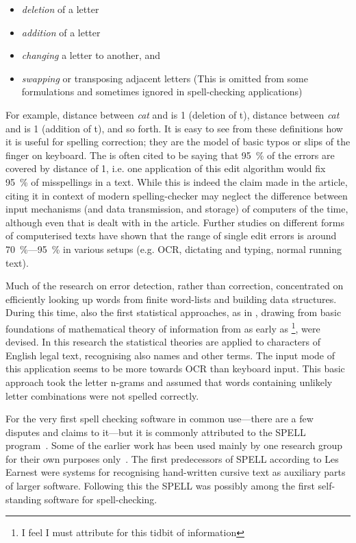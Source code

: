 \documentclass[officiallayout]{unihelcompling}
\newcommand\misspelt{\bgroup\markoverwith
{\textcolor{red}{\lower3.5pt\hbox{\sixly \char58}}}\ULon}
\begin{document}
\begin{itemize}
    \item \emph{deletion} of a letter
    \item \emph{addition} of a letter
    \item \emph{changing} a letter to another, and
    \item \emph{swapping} or transposing adjacent letters
        (This is omitted from some formulations and sometimes ignored in
        spell-checking applications)
\end{itemize}

For example, distance between \emph{cat} and \misspelt{ca} is 1 (deletion of
t), distance between \emph{cat} and \misspelt{catt} is 1 (addition of t), and
so forth.  It is easy to see from these definitions how it is useful for
spelling correction; they are the model of basic typos or slips of the finger
on keyboard. The \citep{damerau1964technique} is often cited to be saying that
95~\% of the errors are covered by distance of 1, i.e. one application of this
edit algorithm would fix 95~\% of misspellings in a text. While this is indeed
the claim made in the article, citing it in context of modern spelling-checker
may neglect the difference between input mechanisms (and data transmission, and
storage) of computers of the time, although even that is dealt with in the
article. Further studies on different forms of computerised texts have shown
that the range of single edit errors is around 70~\%---95~\% in various setups
(e.g. OCR, dictating and typing, normal running text).

Much of the research on error detection, rather than correction, concentrated
on efficiently looking up words from finite word-lists and building data
structures. During this time, also the first statistical approaches, as in
\citet{raviv1967decision}, drawing from basic foundations of mathematical
theory of information from as early as
\citet{shannon1948mathematical}\footnote{I feel I must attribute
\citet{liberman2012noisily} for this tidbit of information}, were devised. In
this research the statistical theories are applied to characters of English
legal text, recognising also names and other terms. The input mode of this
application seems to be more towards OCR than keyboard input. This basic
approach took the letter n-grams and assumed that words containing unlikely
letter combinations were not spelled correctly.

For the very first spell checking software in common use---there are a few
disputes and claims to it---but it is commonly attributed to the SPELL
program~\citep{gorin1971spell}.  Some of the earlier work has been used mainly
by one research group for their own purposes 
only~\citep{earnest2011first,earnest2012first}. The first predecessors of SPELL
according to Les Earnest were systems for recognising hand-written cursive text
as auxiliary parts of larger software. Following this the SPELL was possibly
among the first self-standing software for spell-checking.
\end{document}
